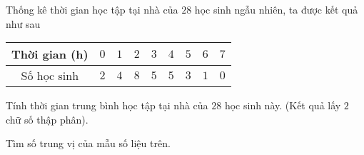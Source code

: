 \begin{bt}%
	Thống kê thời gian học tập tại nhà của $28$ học sinh ngẫu nhiên, ta được kết quả như sau
	
	\hspace{3cm}
	\begin{tabular}{|c|c|c|c|c|c|c|c|c|}
		\hline Thời gian (h) & $0$ & $1$ & $2$ & $3$ & $4$ & $5$ & $6$ & $7$\\
		\hline Số học sinh & $2$ & $4$ & $8$ & $5$ & $5$ & $3$ & $1$ & $0$\\
		\hline
	\end{tabular}
	\begin{listEX}
		\item Tính thời gian trung bình học tập tại nhà của $28$ học sinh này. (Kết quả lấy $2$ chữ số thập phân).
		\item Tìm số trung vị của mẫu số liệu trên.
	\end{listEX}
\end{bt}

